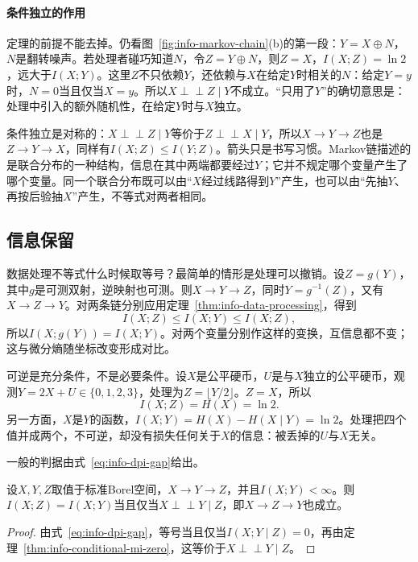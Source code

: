 \paragraph{条件独立的作用}
定理的前提不能去掉。仍看图~\ref{fig:info-markov-chain}(b)的第一段：$Y=X\oplus N$，$N$是翻转噪声。若处理者碰巧知道$N$，令$Z=Y\oplus N$，则$Z=X$，$I(X;Z)=\ln2$，远大于$I(X;Y)$。这里$Z$不只依赖$Y$，还依赖与$X$在给定$Y$时相关的$N$：给定$Y=y$时，$N=0$当且仅当$X=y$。所以$X\perp\!\!\!\perp Z\mid Y$不成立。“只用了$Y$”的确切意思是：处理中引入的额外随机性，在给定$Y$时与$X$独立。

条件独立是对称的：$X\perp\!\!\!\perp Z\mid Y$等价于$Z\perp\!\!\!\perp X\mid Y$，所以$X\to Y\to Z$也是$Z\to Y\to X$，同样有$I(X;Z)\leq I(Y;Z)$。箭头只是书写习惯。Markov链描述的是联合分布的一种结构，信息在其中两端都要经过$Y$；它并不规定哪个变量产生了哪个变量。同一个联合分布既可以由“$X$经过线路得到$Y$”产生，也可以由“先抽$Y$、再按后验抽$X$”产生，不等式对两者相同。

\subsection{信息保留}
\label{sec:info-dpi-preservation}

数据处理不等式什么时候取等号？最简单的情形是处理可以撤销。设$Z=g(Y)$，其中$g$是可测双射，逆映射也可测。则$X\to Y\to Z$，同时$Y=g^{-1}(Z)$，又有$X\to Z\to Y$。对两条链分别应用定理~\ref{thm:info-data-processing}，得到
\[
  I(X;Z)\leq I(X;Y)\leq I(X;Z),
\]
所以$I(X;g(Y))=I(X;Y)$。对两个变量分别作这样的变换，互信息都不变；这与微分熵随坐标改变形成对比。

可逆是充分条件，不是必要条件。设$X$是公平硬币，$U$是与$X$独立的公平硬币，观测$Y=2X+U\in\{0,1,2,3\}$，处理为$Z=\lfloor Y/2\rfloor$。$Z=X$，所以
\[
  I(X;Z)=H(X)=\ln2.
\]
另一方面，$X$是$Y$的函数，$I(X;Y)=H(X)-H(X\mid Y)=\ln2$。处理把四个值并成两个，不可逆，却没有损失任何关于$X$的信息：被丢掉的$U$与$X$无关。

一般的判据由式~\eqref{eq:info-dpi-gap}给出。

\begin{theorem}[信息保留的条件]
\label{thm:info-dpi-equality}
设$X,Y,Z$取值于标准Borel空间，$X\to Y\to Z$，并且$I(X;Y)<\infty$。则$I(X;Z)=I(X;Y)$当且仅当$X\perp\!\!\!\perp Y\mid Z$，即$X\to Z\to Y$也成立。
\end{theorem}

\begin{proof}
由式~\eqref{eq:info-dpi-gap}，等号当且仅当$I(X;Y\mid Z)=0$，再由定理~\ref{thm:info-conditional-mi-zero}，这等价于$X\perp\!\!\!\perp Y\mid Z$。
\end{proof}

